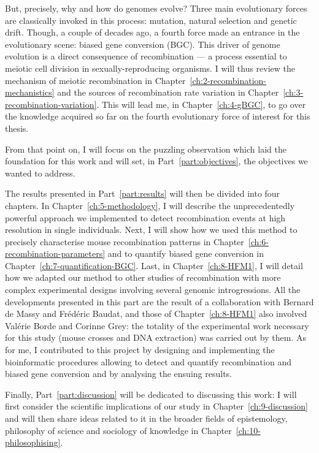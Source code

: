 But, precisely, why and how do genomes evolve?
Three main evolutionary forces are classically invoked in this process: mutation, natural selection and genetic drift.
Though, a couple of decades ago, a fourth force made an entrance in the evolutionary scene: biased gene conversion (BGC).
This driver of genome evolution is a direct consequence of recombination — a process essential to meiotic cell division in sexually-reproducing organisms. 
I will thus review the mechanism of meiotic recombination in Chapter~\ref{ch:2-recombination-mechanistics} and the sources of recombination rate variation in Chapter~\ref{ch:3-recombination-variation}. 
This will lead me, in Chapter~\ref{ch:4-gBGC}, to go over the knowledge acquired so far on the fourth evolutionary force of interest for this thesis.

From that point on, I will focus on the puzzling observation which laid the foundation for this work and will set, in Part~\ref{part:objectives}, the objectives we wanted to address.


The results presented in Part~\ref{part:results} will then be divided into four chapters.
In Chapter~\ref{ch:5-methodology}, I will describe the unprecedentedly powerful approach we implemented to detect recombination events at high resolution in single individuals.
Next, I will show how we used this method to precisely characterise mouse recombination patterns in Chapter~\ref{ch:6-recombination-parameters} and to quantify biased gene conversion in Chapter~\ref{ch:7-quantification-BGC}.
Last, in Chapter~\ref{ch:8-HFM1}, I will detail how we adapted our method to other studies of recombination with more complex experimental designs involving several genomic introgressions.
All the developments presented in this part are the result of a collaboration with Bernard de Massy and Frédéric Baudat, and those of Chapter~\ref{ch:8-HFM1} also involved Valérie Borde and Corinne Grey: the totality of the experimental work necessary for this study (mouse crosses and DNA extraction) was carried out by them.
As for me, I contributed to this project by designing and implementing the bioinformatic procedures allowing to detect and quantify recombination and biased gene conversion and by analysing the ensuing results.

Finally, Part~\ref{part:discussion} will be dedicated to discussing this work: I will first consider the scientific implications of our study in Chapter~\ref{ch:9-discussion} and will then share ideas related to it in the broader fields of epistemology, philosophy of science and sociology of knowledge in Chapter~\ref{ch:10-philosophising}.




